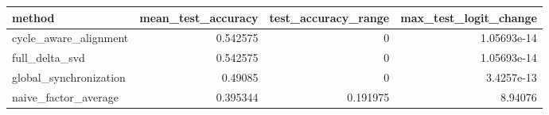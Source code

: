 \begin{tabular}{lrrr}
\toprule
method & mean_test_accuracy & test_accuracy_range & max_test_logit_change \\
\midrule
cycle_aware_alignment & 0.542575 & 0 & 1.05693e-14 \\
full_delta_svd & 0.542575 & 0 & 1.05693e-14 \\
global_synchronization & 0.49085 & 0 & 3.4257e-13 \\
naive_factor_average & 0.395344 & 0.191975 & 8.94076 \\
\bottomrule
\end{tabular}
